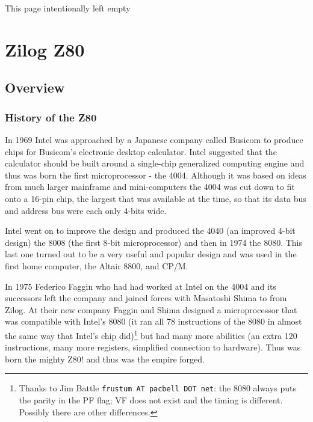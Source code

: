 \documentclass[12pt,twoside,openright,a4paper]{book}
\newcommand{\intentiallyempty}{
	\mbox{}
	\vfill
	\begin{center}
	This page intentionally left empty
	\end{center}
	\vfill
	\mbox{}
}
\begin{document}
\pagebreak
\intentiallyempty
\pagebreak


\chapter{Zilog Z80}


\minitoc

\pagebreak
\section{Overview}
\subsection{History of the Z80}

In 1969 Intel was approached by a Japanese company called Busicom to produce  chips for Busicom's electronic desktop calculator. Intel suggested that the calculator should be built around a single-chip generalized computing engine and thus was born the first microprocessor - the 4004. Although it was based on ideas from much larger mainframe and mini-computers the 4004 was cut down to fit onto a 16-pin chip, the largest that was available at the time, so that its data bus and address bus were each only 4-bits wide. 

Intel went on to improve the design and produced the 4040 (an improved 4-bit design) the 8008 (the first 8-bit microprocessor) and then in 1974 the 8080. This last one turned out to be a very useful and popular design and was used in the first home computer, the Altair 8800, and CP/M. 

In 1975 Federico Faggin who had had worked at Intel on the 4004 and its successors left the company and joined forces with Masatoshi Shima to from Zilog. At their new company Faggin and Shima designed a microprocessor that was compatible with Intel's 8080 (it ran all 78 instructions of the 8080 in almost the same way that Intel's chip did)\footnote{Thanks to Jim Battle {\tt frustum AT pacbell DOT net}: the 8080 always puts the parity in the PF flag; VF does not exist and the timing is different. Possibly there are other differences.} but had many more abilities (an extra 120 instructions, many more registers, simplified connection to hardware). Thus was born the mighty Z80! and thus was the empire forged.
\end{document}
